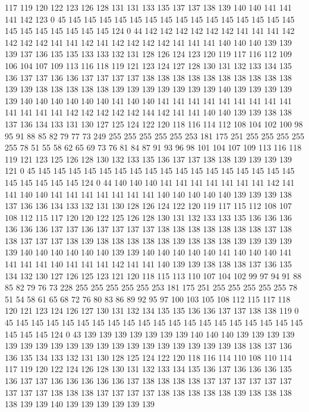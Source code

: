 117 119 120 122 123 126 128 131 131 133 135 137 137 138 139 140 140 141 141 141
142 123 0 45 145 145 145 145 145 145 145 145 145 145 145 145 145 145 145 145
145 145 145 145 145 145 124 0 44 142 142 142 142 142 142 141 141 141 142 142
142 142 141 141 142 141 142 142 142 142 141 141 141 140 140 140 139 139 139 137
136 135 135 133 133 132 131 128 126 124 123 120 119 117 116 112 109 106 104 107
109 113 116 118 119 121 123 124 127 128 130 131 132 133 134 135 136 137 137 136
136 137 137 137 137 138 138 138 138 138 138 138 138 138 138 139 139 138 138 138
138 138 139 139 139 139 139 139 139 140 139 139 139 139 139 140 140 140 140 140
140 141 140 140 141 141 141 141 141 141 141 141 141 141 141 141 141 142 142 142
142 142 144 142 141 141 140 140 139 139 138 138 137 136 134 133 131 130 127 125
124 122 120 118 116 114 112 108 104 102 100 98 95 91 88 85 82 79 77 73
249 255 255 255 255 255 253 181 175 251 255 255 255 255 255 78 51 55 58 62
65 69 73 76 81 84 87 91 93 96 98 101 104 107 109 113 116 118 119 121
123 125 126 128 130 132 133 135 136 137 137 138 138 139 139 139 139 121 0 45
145 145 145 145 145 145 145 145 145 145 145 145 145 145 145 145 145 145 145 145
145 145 124 0 44 140 140 140 141 141 141 141 141 141 141 142 141 141 140 140
141 141 141 141 141 141 141 140 140 140 140 140 139 139 139 138 137 136 136 134
133 132 131 130 128 126 124 122 120 119 117 115 112 108 107 108 112 115 117 120
120 122 125 126 128 130 131 132 133 133 135 136 136 136 136 136 136 137 137 136
137 137 137 137 138 138 138 138 138 138 138 137 138 138 137 137 137 138 139 138
138 138 138 138 139 138 138 138 139 139 139 139 139 140 140 140 140 140 140 139
139 140 140 140 140 140 141 140 140 140 141 141 141 141 140 141 141 141 142 141
141 140 139 139 138 138 138 137 136 135 134 132 130 127 126 125 123 121 120 118
115 113 110 107 104 102 99 97 94 91 88 85 82 79 76 73 228 255 255 255
255 255 253 181 175 251 255 255 255 255 255 78 51 54 58 61 65 68 72 76
80 83 86 89 92 95 97 100 103 105 108 112 115 117 118 120 121 123 124 126
127 130 131 132 134 135 135 136 136 137 137 138 138 119 0 45 145 145 145 145
145 145 145 145 145 145 145 145 145 145 145 145 145 145 145 145 145 145 124 0
43 139 139 139 139 139 139 139 140 140 140 139 139 139 139 139 139 139 139 139
139 139 139 139 139 139 139 139 139 139 138 138 137 136 136 135 134 133 132 131
130 128 125 124 122 120 118 116 114 110 108 110 114 117 119 120 122 124 126 128
130 131 132 133 134 135 136 137 136 136 136 135 136 137 137 136 136 136 136 136
137 138 138 138 138 137 137 137 137 137 137 137 137 137 138 138 138 137 137 137
137 138 138 138 138 138 139 138 138 138 138 139 139 140 139 139 139 139 139 139
